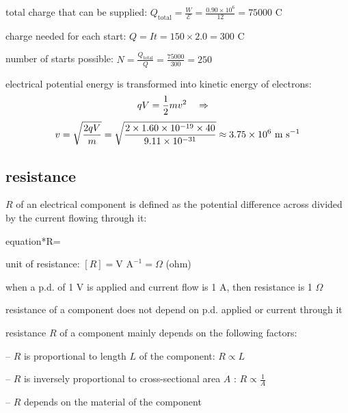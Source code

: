 \begin{soln} total charge that can be supplied: $Q_\text{total} = \frac{W}{\mathcal{E}} = \frac{0.90 \times 10^6}{12} = 75000 \text{ C}$

charge needed for each start: $Q = I t = 150 \times 2.0 = 300 \text{ C}$

number of starts possible: $N = \frac{Q_\text{total}}{Q} = \frac{75000}{300} = 250$ \end{soln}


\begin{soln} electrical potential energy is transformed into kinetic energy of electrons:
\begin{equation*}
qV = \frac{1}{2}mv^2 \quad \Rightarrow \quad 
\end{equation*}
\begin{equation*}
v=\sqrt{\frac{2qV}{m}} = \sqrt{\frac{2 \times 1.60 \times 10^{-19} \times 40}{9.11 \times 10^{-31}}} \approx 3.75 \times 10^6 \text{ m s$^{-1}$} 
\end{equation*}
\end{soln}



\subsection{resistance}

\begin{ilight}
	 $R$ of an electrical component is defined as the potential difference across divided by the current flowing through it: \begin{empheq}[box=\tcbhighmath]{equation*}{R=} \end{empheq}
\end{ilight}


\cmt unit of resistance: $ [R] = \text{V A}^{-1} = \Omega $ (ohm)

when a p.d. of 1 V is applied and current flow is 1 A, then resistance is 1 $\Omega$

\cmt resistance of a component does not depend on p.d. applied or current through it

\cmt resistance $R$ of a component mainly depends on the following factors:

\begin{compactitem}
	\item[--] $R$ is proportional to length $L$ of the component: $R \propto L$
	
	\item[--] $R$ is inversely proportional to cross-sectional area $A$ : $R \propto \frac{1}{A}$
	
	\item[--] $R$ depends on the material of the component
\end{compactitem}


